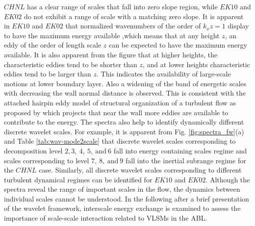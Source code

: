 $CHNL$ has a clear range of scales that fall into zero slope region, while $EK10$ and $EK02$ do not exhibit a range of scale with a matching zero slope. It is apparent in $EK10$ and $EK02$ that normalized wavenumbers of the order of $k_xz=1$ display to have the maximum energy available ,which means that at any height $z$, an eddy of the order of length scale $z$ can be expected to have the maximum energy available. It is also apparent from the figure that at higher heights, the characteristic eddies tend to be shorter than $z$, and at lower heights characteristic eddies tend to be larger than $z$. This indicates the availability of large-scale motions at lower boundary layer. Also a widening of the band of energetic scales with decreasing the wall normal distance is observed. This is consistent with the attached hairpin eddy model of structural organization of a turbulent flow as proposed by \citet{perry_chng_jfm_86, nickels_marusic_jfm_2001} which projects that near the wall more eddies are available to contribute to the energy. The spectra also help to identify dynamically different discrete wavelet scales. For example, it is apparent from Fig. \ref{fig:spectra_fw}(a) and Table \ref{tab:wav-mode2scale} that discrete wavelet scales corresponding to decomposition level $2, 3,\ 4,\ 5, \ \text{and} \ 6$ fall into energy containing scales regime and scales corresponding to level $7,\ 8, \ \text{and} \ 9 $ fall into the inertial subrange regime for the $CHNL$ case. Similarly, all discrete wavelet scales corresponding to different turbulent dynamical regimes can be identified for $EK10$ and $EK02$. Although the spectra reveal the range of important scales in the flow, the dynamics between individual scales cannot be understood. In the following after a brief presentation of the wavelet framework, interscale energy exchange is examined to assess the importance of scale-scale interaction related to VLSMs in the ABL. 


